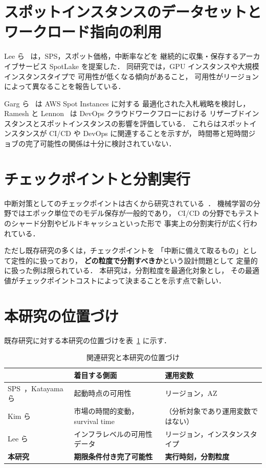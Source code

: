 \documentclass[11pt,a4paper]{ltjsreport}
\begin{document}
\section{スポットインスタンスのデータセットとワークロード指向の利用}

Lee ら~\cite{Lee2022SpotLake} は，SPS，スポット価格，中断率などを
継続的に収集・保存するアーカイブサービス SpotLake を提案した．
同研究では，GPU インスタンスや大規模インスタンスタイプで
可用性が低くなる傾向があること，
可用性がリージョンによって異なることを報告している．

Garg ら~\cite{Garg2025} は AWS Spot Instances に対する
最適化された入札戦略を検討し，
Ramesh と Lennon~\cite{Ramesh2025} は DevOps クラウドワークフローにおける
リザーブドインスタンスとスポットインスタンスの影響を評価している．
これらはスポットインスタンスが CI/CD や DevOps に関連することを示すが，
時間帯と短時間ジョブの完了可能性の関係は十分に検討されていない．

\section{チェックポイントと分割実行}

中断対策としてのチェックポイントは古くから研究されている~\cite{Lin2022Survey}．
機械学習の分野ではエポック単位でのモデル保存が一般的であり，
CI/CD の分野でもテストのシャード分割やビルドキャッシュといった形で
事実上の分割実行が広く行われている．

ただし既存研究の多くは，チェックポイントを
「中断に備えて取るもの」として定性的に扱っており，
\textbf{どの粒度で分割すべきか}という設計問題として
定量的に扱った例は限られている．
本研究は，分割粒度を最適化対象とし，
その最適値がチェックポイントコストによって決まることを示す点で新しい．

\section{本研究の位置づけ}

既存研究に対する本研究の位置づけを表~\ref{tab:related} に示す．

\begin{table}[htbp]
\centering
\caption{関連研究と本研究の位置づけ}
\label{tab:related}
\small
\begin{tabularx}{\textwidth}{@{}lXX@{}}
\toprule
 & \textbf{着目する側面} & \textbf{運用変数} \\
\midrule
SPS~\cite{AWSSPS}，Katayama ら~\cite{Katayama2022}
  & 起動時点の可用性
  & リージョン，AZ \\
\addlinespace
Kim ら~\cite{Kim2024SpotInterruption}
  & 市場の時間的変動，survival time
  & （分析対象であり運用変数ではない） \\
\addlinespace
Lee ら~\cite{Lee2022SpotLake}
  & インフラレベルの可用性データ
  & リージョン，インスタンスタイプ \\
\addlinespace
\textbf{本研究}
  & \textbf{期限条件付き完了可能性}
  & \textbf{実行時刻，分割粒度} \\
\bottomrule
\end{tabularx}
\end{table}
\end{document}
